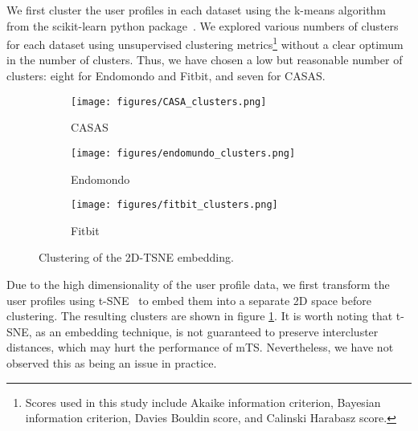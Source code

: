 \documentclass{article}
\begin{document}
We first cluster the user profiles in each dataset using the k-means algorithm from the scikit-learn python package~\citep{scikit-learn}. We explored various numbers of clusters for each dataset using unsupervised clustering metrics\footnote{Scores used in this study include Akaike information criterion, Bayesian information criterion, Davies Bouldin score, and Calinski Harabasz score.} without a clear optimum in the number of clusters. Thus, we have chosen a low but reasonable number of clusters: eight for Endomondo and Fitbit, and seven for CASAS. 

\begin{figure}
     \centering
     \begin{subfigure}[b]{0.32\textwidth}
         \centering
         \texttt{[image: figures/CASA\_clusters.png]}
         \caption{CASAS}
 
     \end{subfigure}
     \hfill
     \begin{subfigure}[b]{0.32\textwidth}
         \centering
         \texttt{[image: figures/endomundo\_clusters.png]}
         \caption{Endomondo}
        
     \end{subfigure}
     \hfill
     \begin{subfigure}[b]{0.32\textwidth}
         \centering
         \texttt{[image: figures/fitbit\_clusters.png]}
         \caption{Fitbit}
     \end{subfigure}
        \caption{Clustering of the 2D-TSNE embedding.}
        \label{fig:clusters}
\end{figure}

Due to the high dimensionality of the user profile data, we first transform the user profiles using t-SNE~\citep{t-sne} to embed them into a separate 2D space before clustering. The resulting clusters are shown in figure \ref{fig:clusters}. 
It is worth noting that t-SNE, as an embedding technique, is not guaranteed to preserve intercluster distances, which may hurt the performance of mTS. Nevertheless, we have not observed this as being an issue in practice.

\end{document}
